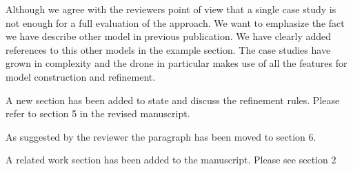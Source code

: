 \documentclass{response}
\begin{document}
\begin{response}
Although we agree with the reviewers point of view that a single case study is
not enough for a full evaluation of the approach. We want to emphasize the fact
we have describe other model in previous publication. We have clearly added
references to this other models in the example section. The case studies have
grown in complexity and the drone in particular makes use of all the features
for model construction and refinement.
\end{response}


\begin{comment}{Reviewer \#2}
General comments:
  - The three refinement rules listed in the introduction have not been 
  described explicitly in the rest of the paper. Please describe them (using 
  minimal examples) in section 3.
\end{comment}

\begin{response}
A new section has been added to state and discuss the refinement rules. 
Please refer to section 5 in the revised manuscript.
\end{response}


\begin{comment}{Reviewer \#2}
  - In the introduction, the paragraph before last "Page 3: lines 7 to 17" that
  compares the proposed approach to the work presented in [4] may be pushed to
  Section 3 or 4 since such comparison is meaningless before presenting the
  details of the approach and the example.
\end{comment}

\begin{response}
  As suggested by the reviewer the paragraph has been moved to section 6. 
\end{response}


\begin{comment}{Reviewer \#2}
 - The paper lacks a related work section. Please add one.
\end{comment}

\begin{response}
A related work section has been added to the manuscript. Please see section 2
\end{response}



\begin{comment}{Reviewer \#2}
Minor points:
  - After an introductory word or phrase, use a comma (this is a recurrent in
  the paper). For example, e.g. --> e.g., i.e. --> i.e., "To verify liveness 
  we outline" --> "To verify liveness,  we outline", etc.
\end{comment}
\end{document}
